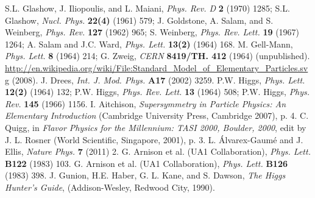\documentclass[12pt, letterpaper]{report}
\begin{document}
\begin{thebibliography}{99}


 S.L. Glashow, J. Iliopoulis, and L. Maiani, \textit{Phys. Rev. D} \textbf{2} (1970) 1285; S.L. Glashow, \textit{Nucl. Phys.} \textbf{22(4)} (1961) 579; J. Goldstone, A. Salam, and S. Weinberg, \textit{Phys. Rev.} \textbf{127} (1962) 965; S. Weinberg, \textit{Phys. Rev. Lett.} \textbf{19} (1967) 1264; A. Salam and J.C. Ward, \textit{Phys. Lett.} \textbf{13(2)} (1964) 168.
 M. Gell-Mann, \textit{Phys. Lett.} \textbf{8} (1964) 214; G. Zweig, \textit{CERN} \textbf{8419/TH. 412} (1964) (unpublished).
 \url{http://en.wikipedia.org/wiki/File:Standard_Model_of_Elementary_Particles.svg} (2008).
 J. Drees, \textit{Int. J. Mod. Phys.} \textbf{A17} (2002) 3259.
 P.W. Higgs, \textit{Phys. Lett.} \textbf{12(2)} (1964) 132; P.W. Higgs, \textit{Phys. Rev. Lett.} \textbf{13} (1964) 508; P.W. Higgs, \textit{Phys. Rev.} \textbf{145} (1966) 1156.
 I. Aitchison, \textit{Supersymmetry in Particle Physics: An Elementary Introduction} (Cambridge University Press, Cambridge 2007), p. 4.
 C. Quigg, in \textit{Flavor Physics for the Millennium: TASI 2000, Boulder, 2000}, edit by J. L. Rosner (World Scientific, Singapore, 2001), p. 3.
 L. \'{A}lvarex-Gaum\'{e} and J. Ellis, \textit{Nature Phys.} \textbf{7} (2011) 2.
 G. Arnison et al. (UA1 Collaboration), \textit{Phys. Lett.} \textbf{B122} (1983) 103.
 G. Arnison et al. (UA1 Collaboration), \textit{Phys. Lett.} \textbf{B126} (1983) 398.
 J. Gunion, H.E. Haber, G. L. Kane, and S. Dawson, \textit{The Higgs Hunter's Guide}, (Addison-Wesley, Redwood City, 1990).



\end{thebibliography}
\end{document}
